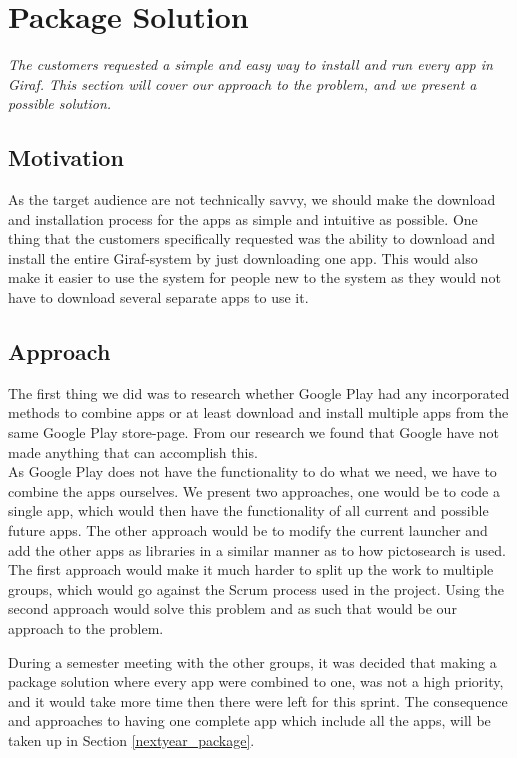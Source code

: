 \section{Package Solution} \label{Sprint4_PackageSolution}
\textit{The customers requested a simple and easy way to install and run every app in Giraf. This section will cover our approach to the problem, and we present a possible solution.}

\subsection{Motivation}
As the target audience are not technically savvy, we should make the download and installation process for the apps as simple and intuitive as possible. One thing that the customers specifically requested was the ability to download and install the entire Giraf-system by just downloading one app. This would also make it easier to use the system for people new to the system as they would not have to download several separate apps to use it.

\subsection{Approach}
The first thing we did was to research whether Google Play had any incorporated methods to combine apps or at least download and install multiple apps from the same Google Play store-page. From our research we found that Google have not made anything that can accomplish this.\\
As Google Play does not have the functionality to do what we need, we have to combine the apps ourselves. We present two approaches, one would be to code a single app, which would then have the functionality of all current and possible future apps. The other approach would be to modify the current launcher and add the other apps as libraries in a similar manner as to how pictosearch is used.
The first approach would make it much harder to split up the work to multiple groups, which would go against the Scrum process used in the project. Using the second approach would solve this problem and as such that would be our approach to the problem.

During a semester meeting with the other groups, it was decided that making a package solution where every app were combined to one, was not a high priority, and it would take more time then there were left for this sprint. The consequence and approaches to having one complete app which include all the apps, will be taken up in Section \ref{nextyear_package}.

